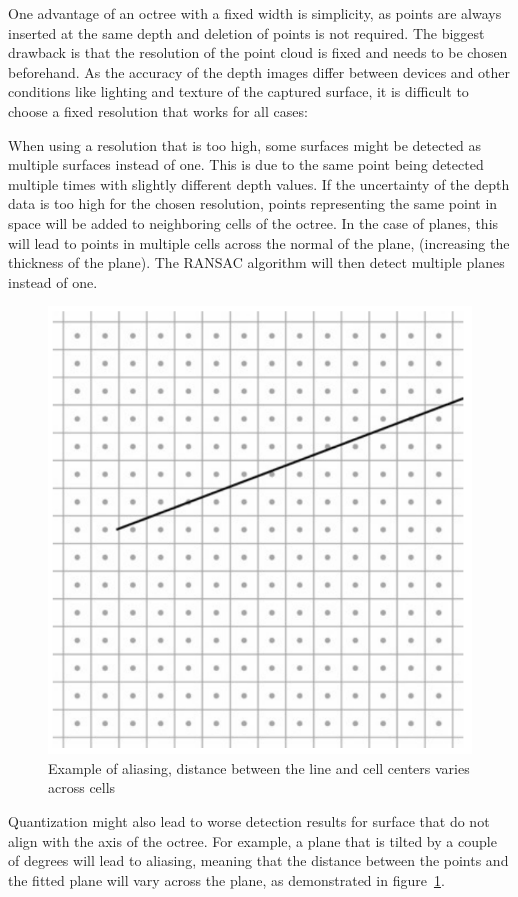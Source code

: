 One advantage of an octree with a fixed width is simplicity, as points are always inserted at the same depth and deletion of points is not required.
The biggest drawback is that the resolution of the point cloud is fixed and needs to be chosen beforehand.
As the accuracy of the depth images differ between devices and other conditions like lighting and texture of the captured surface,
it is difficult to choose a fixed resolution that works for all cases:

When using a resolution that is too high, some surfaces might be detected as multiple surfaces instead of one.
This is due to the same point being detected multiple times with slightly different depth values.
If the uncertainty of the depth data is too high for the chosen resolution,
points representing the same point in space will be added to neighboring cells of the octree.
In the case of planes, this will lead to points in multiple cells across the normal of the plane,
(increasing the thickness of the plane).
The RANSAC algorithm will then detect multiple planes instead of one.

\begin{figure}[h!]
    \centering
    \includegraphics[width=0.35\linewidth]{images/aliasing}
    \caption{Example of aliasing, distance between the line and cell centers varies across cells}
    \label{fig:aliasing}
\end{figure}

Quantization might also lead to worse detection results for surface that do not align with the axis of the octree.
For example, a plane that is tilted by a couple of degrees will lead to aliasing,
meaning that the distance between the points and the fitted plane will vary across the plane, as demonstrated in figure~\ref{fig:aliasing}.

